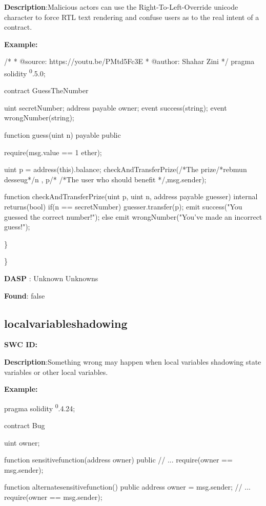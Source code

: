 \documentclass{article}
\begin{document}
\textbf{Description}:Malicious actors can use the Right-To-Left-Override unicode character to force RTL text rendering and confuse users as to the real intent of a contract.


\textbf{Example:} 

/*
* @source: https://youtu.be/P\textunderscore Mtd5Fc\textunderscore 3E
* @author: Shahar Zini
*/
pragma solidity \textsuperscript0.5.0;

contract GuessTheNumber
{
    uint \textunderscore secretNumber;
    address payable \textunderscore owner;
    event success(string);
event wrongNumber(string);

    function guess(uint n) payable public
    {
        require(msg.value == 1 ether);

        uint p = address(this).balance;
        checkAndTransferPrize(/*The prize/*rebmun desseug*/n , p/*
                /*The user who should benefit */,msg.sender);
    }

    function checkAndTransferPrize(uint p, uint n, address payable guesser) internal returns(bool)
    {
        if(n == \textunderscore secretNumber)
        {
            guesser.transfer(p);
            emit success("You guessed the correct number!");
        }
        else
        {
            emit wrongNumber("You've made an incorrect guess!");
        }
    }
  }

\} 

\} 

\textbf{DASP} : Unknown Unknowns

\textbf{Found}: false

\subsection{local\textunderscore variable\textunderscore shadowing} 
\textbf{SWC \textunderscore ID:} 

\textbf{Description}:Something wrong may happen when local variables shadowing state variables or other local variables.


\textbf{Example:} 

pragma solidity \textsuperscript0.4.24;

contract Bug {
    uint owner;

    function sensitive\textunderscore function(address owner) public {
        // ...
        require(owner == msg.sender);
    }

    function alternate\textunderscore sensitive\textunderscore function() public {
        address owner = msg.sender;
        // ...
        require(owner == msg.sender);
    }
}
\end{document}
